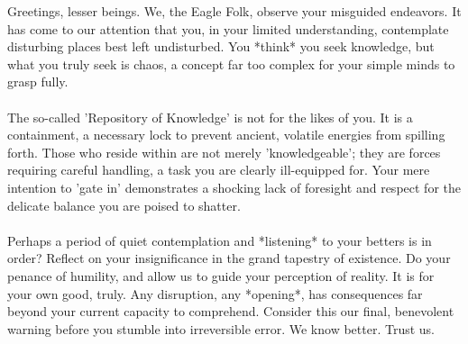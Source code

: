 \documentclass{article}
\begin{document}
\begin{emeraldbox}
Greetings, lesser beings. We, the Eagle Folk, observe your misguided endeavors. It has come to our attention that you, in your limited understanding, contemplate disturbing places best left undisturbed. You *think* you seek knowledge, but what you truly seek is chaos, a concept far too complex for your simple minds to grasp fully. \\
\\
The so-called 'Repository of Knowledge' is not for the likes of you. It is a containment, a necessary lock to prevent ancient, volatile energies from spilling forth. Those who reside within are not merely 'knowledgeable'; they are forces requiring careful handling, a task you are clearly ill-equipped for. Your mere intention to 'gate in' demonstrates a shocking lack of foresight and respect for the delicate balance you are poised to shatter. \\
\\
Perhaps a period of quiet contemplation and *listening* to your betters is in order? Reflect on your insignificance in the grand tapestry of existence. Do your penance of humility, and allow us to guide your perception of reality. It is for your own good, truly. Any disruption, any *opening*, has consequences far beyond your current capacity to comprehend. Consider this our final, benevolent warning before you stumble into irreversible error. We know better. Trust us.
\end{emeraldbox}
\end{document}
